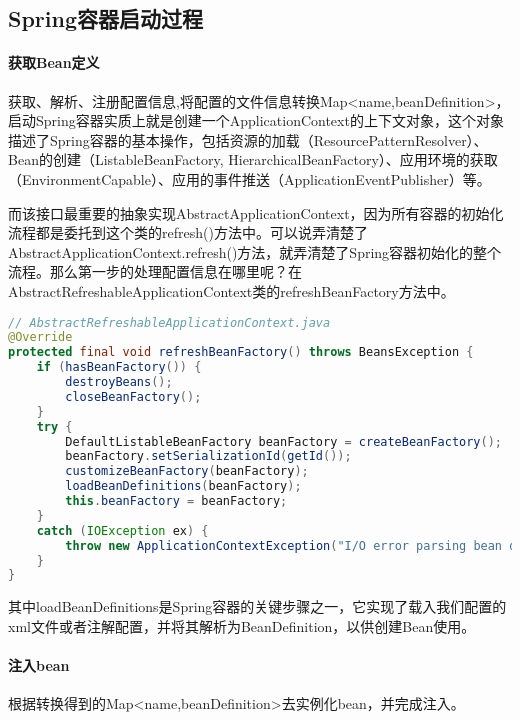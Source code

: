 \documentclass[../../../interview-questions.tex]{subfiles}
\begin{document}
\subsection{Spring容器启动过程}

\paragraph{获取Bean定义}

获取、解析、注册配置信息,将配置的文件信息转换Map<name,beanDefinition>，启动Spring容器实质上就是创建一个ApplicationContext的上下文对象，这个对象描述了Spring容器的基本操作，包括资源的加载（ResourcePatternResolver）、Bean的创建（ListableBeanFactory, HierarchicalBeanFactory）、应用环境的获取（EnvironmentCapable）、应用的事件推送（ApplicationEventPublisher）等。

而该接口最重要的抽象实现AbstractApplicationContext，因为所有容器的初始化流程都是委托到这个类的refresh()方法中。可以说弄清楚了AbstractApplicationContext.refresh()方法，就弄清楚了Spring容器初始化的整个流程。那么第一步的处理配置信息在哪里呢？在AbstractRefreshableApplicationContext类的refreshBeanFactory方法中。

\begin{lstlisting}[language=Java]
// AbstractRefreshableApplicationContext.java
@Override
protected final void refreshBeanFactory() throws BeansException {
    if (hasBeanFactory()) {
        destroyBeans();
        closeBeanFactory();
    }
    try {
        DefaultListableBeanFactory beanFactory = createBeanFactory();
        beanFactory.setSerializationId(getId());
        customizeBeanFactory(beanFactory);
        loadBeanDefinitions(beanFactory);
        this.beanFactory = beanFactory;
    }
    catch (IOException ex) {
        throw new ApplicationContextException("I/O error parsing bean definition source for " + getDisplayName(), ex);
    }
}    
\end{lstlisting}

其中loadBeanDefinitions是Spring容器的关键步骤之一，它实现了载入我们配置的xml文件或者注解配置，并将其解析为BeanDefinition，以供创建Bean使用。

\paragraph{注入bean}

根据转换得到的Map<name,beanDefinition>去实例化bean，并完成注入。
\end{document}
